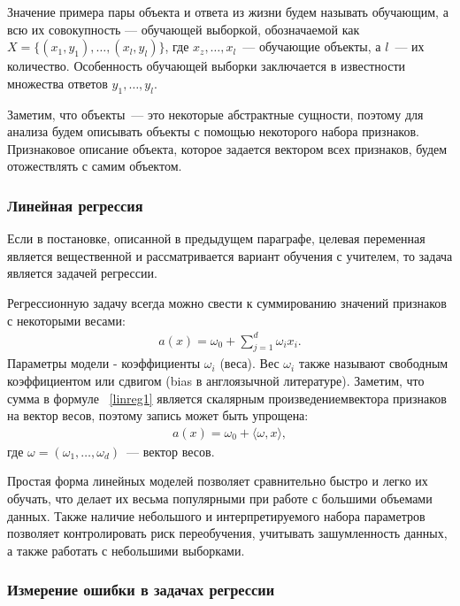 \documentclass[12pt,a4paper]{article} %
\begin{document}
Значение примера пары объекта и ответа из жизни будем называть обучающим, а всю их совокупность --- обучающей выборкой, обозначаемой как $X = \{(x_1, y_1), \dots, (x_l, y_l)\}$, где $x_z, \dots, x_l$~--- обучающие объекты, а $l$~--- их количество. Особенность обучающей выборки заключается в известности множества ответов $y_1,\dots,y_l$.

Заметим, что объекты~--- это некоторые абстрактные сущности, поэтому для анализа будем описывать объекты с помощью некоторого набора признаков. Признаковое описание объекта, которое задается вектором всех признаков, будем отожествлять с самим объектом.

\subsubsection{Линейная регрессия}

Если в постановке, описанной в предыдущем параграфе, целевая переменная является вещественной и рассматривается вариант обучения с учителем, то задача является задачей регрессии.

Регрессионную задачу всегда можно свести к суммированию значений признаков с некоторыми весами:
\begin{gather}\label{linreg1}
	a(x) = \omega_0 + \sum\limits_{j=1}^{d} \omega_i x_i.
\end{gather}
Параметры модели - коэффициенты $\omega_i$ (веса). Вес $\omega_i$ также называют свободным коэффициентом или сдвигом (bias в англоязычной литературе). Заметим, что сумма в формуле ~\ref{linreg1} является скалярным произведениемвектора признаков на вектор весов, поэтому запись может быть упрощена:
\begin{gather}\label{linreg2}
	 a(x) = \omega_0 + \langle \omega, x\rangle,
\end{gather}
где $\omega = (\omega_1,\dots,\omega_d)$~--- вектор весов.

Простая форма линейных моделей позволяет сравнительно быстро и легко их обучать, что делает их весьма популярными при работе с большими объемами данных\cite{Hastie}. Также наличие небольшого и интерпретируемого набора параметров позволяет контролировать риск переобучения, учитывать зашумленность данных, а также работать с небольшими выборками.

\subsubsection{Измерение ошибки в задачах регрессии}
\end{document}
